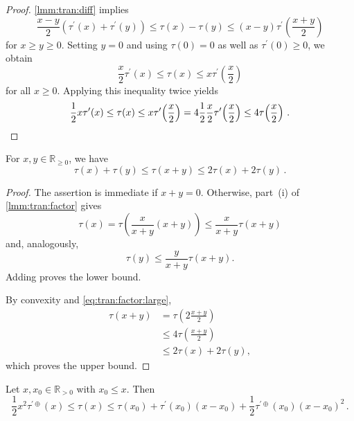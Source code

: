 \documentclass{article}
\newcommand{\R}{\mathbb{R}}
\newcommand{\Rp}{\R_{\geq0}}
\newcommand{\Rpp}{\R_{>0}}
\newcommand{\lb}{\left(} %
\newcommand{\rb}{\right)} %
\newcommand{\br}[1]{\lb #1 \rb} %
\newcommand{\brOf}[1]{\!\br{#1}} %
\newcommand{\pr}{^\prime}
\newcommand{\eqfs}{\,.}
\newcommand{\tran}{\tau}
\newcommand{\dtran}{\tau\pr}
\newcommand{\ddrtran}{\tau^{\prime\oplus}}
\begin{document}
%
\begin{proof}
	\cref{lmm:tran:diff} implies
	\begin{equation}
		\frac{x-y}{2}\br{\dtran(x)+\dtran(y)} \leq \tran(x)-\tran(y) \leq (x-y) \dtran\brOf{\frac{x+y}2}
	\end{equation}
	for $x \geq y \geq 0$.
	Setting $y=0$ and using $\tran(0) = 0$ as well as $\dtran(0) \geq 0$, we obtain
	\begin{equation}
		\frac{x}{2}\dtran(x) \leq \tran(x) \leq x \dtran\brOf{\frac{x}2}
	\end{equation}
	for all $x\geq 0$. Applying this inequality twice yields
	\begin{equation}
		\frac12x\dtran(x) \leq \tran(x) \leq x \dtran\brOf{\frac{x}2} = 4 \frac12\frac{x}{2} \dtran\brOf{\frac{x}2}  \leq 4 \tran\brOf{\frac{x}2}
		\eqfs
        \qedhere
	\end{equation}
\end{proof}
%
\begin{lemma}\label{lmm:tran:add}
    For $x,y\in\Rp$, we have
    \begin{equation}\label{eq:tran:add}
        \tran(x)+\tran(y)
        \leq
        \tran(x+y)
        \leq
        2\tran(x)+2\tran(y)
        \eqfs
    \end{equation}
\end{lemma}
%
\begin{proof}
    The assertion is immediate if $x+y=0$. Otherwise, part~\textup{(i)}
    of \cref{lmm:tran:factor} gives
    \begin{equation}
        \tran(x)
        =
        \tran\brOf{\frac{x}{x+y}(x+y)}
        \leq
        \frac{x}{x+y}\tran(x+y)
    \end{equation}
    and, analogously,
    \begin{equation}
        \tran(y)
        \leq
        \frac{y}{x+y}\tran(x+y).
    \end{equation}
    Adding proves the lower bound.
    
    By convexity and \eqref{eq:tran:factor:large},
    \begin{align}
        \tran(x+y)
        &=
        \tran\brOf{2\frac{x+y}{2}}\\
        &\leq
        4\tran\brOf{\frac{x+y}{2}}\\
        &\leq
        2\tran(x)+2\tran(y),
    \end{align}
    which proves the upper bound.
\end{proof}
%
\begin{lemma}\label{lmm:tran:sqrddtran}
	 Let $x, x_0 \in \Rpp$ with $x_0 \leq x$.
	 Then
	 \begin{equation}
	 	\frac12 x^2 \ddrtran(x) 
	 	\leq 
	 	\tran(x) 
	 	\leq 
	 	\tran(x_0)
	 	+
	 	\dtran(x_0) (x- x_0)
	 	+
	 	\frac12 \ddrtran(x_0)(x - x_0)^2
	 	\eqfs
	 \end{equation}
\end{lemma}
\end{document}
